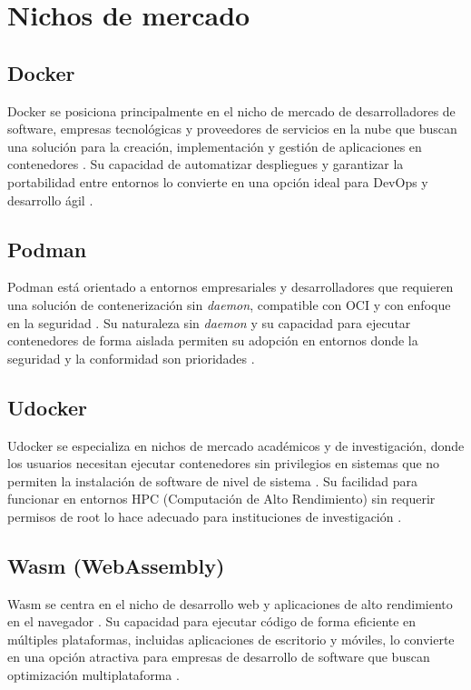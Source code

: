 \section{Nichos de mercado}

\subsection{Docker}
Docker se posiciona principalmente en el nicho de mercado de desarrolladores de software, empresas tecnológicas y proveedores de servicios en la nube que buscan una solución para la creación, implementación y gestión de aplicaciones en contenedores \citep{Hill2025}. Su capacidad de automatizar despliegues y garantizar la portabilidad entre entornos lo convierte en una opción ideal para DevOps y desarrollo ágil \citep{Mag2025}.

\subsection{Podman}
Podman está orientado a entornos empresariales y desarrolladores que requieren una solución de contenerización sin \textit{daemon}, compatible con OCI y con enfoque en la seguridad \citep{Surendhar2024}. Su naturaleza sin \textit{daemon} y su capacidad para ejecutar contenedores de forma aislada permiten su adopción en entornos donde la seguridad y la conformidad son prioridades \citep{Trevor2022}.

\subsection{Udocker}
Udocker se especializa en nichos de mercado académicos y de investigación, donde los usuarios necesitan ejecutar contenedores sin privilegios en sistemas que no permiten la instalación de software de nivel de sistema \citep{Campos2017}. Su facilidad para funcionar en entornos HPC (Computación de Alto Rendimiento) sin requerir permisos de root lo hace adecuado para instituciones de investigación \citep{Gomes2018}.

\subsection{Wasm (WebAssembly)}
Wasm se centra en el nicho de desarrollo web y aplicaciones de alto rendimiento en el navegador \citep{Haas2017}. Su capacidad para ejecutar código de forma eficiente en múltiples plataformas, incluidas aplicaciones de escritorio y móviles, lo convierte en una opción atractiva para empresas de desarrollo de software que buscan optimización multiplataforma \citep{Jangda2019}.

